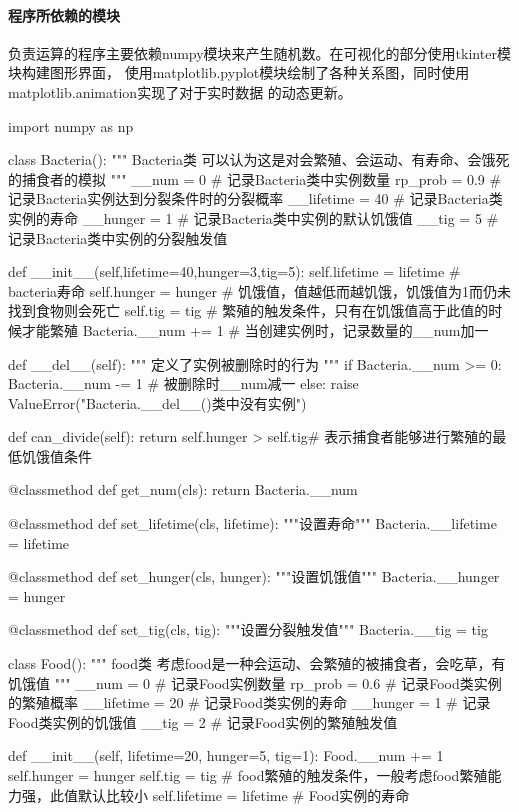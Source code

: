 \documentclass[a4paper]{ctexart}
\begin{document}
	\paragraph{程序所依赖的模块}
	负责运算的程序主要依赖numpy模块来产生随机数。在可视化的部分使用tkinter模块构建图形界面，
	使用matplotlib.pyplot模块绘制了各种关系图，同时使用matplotlib.animation实现了对于实时数据
	的动态更新。
	\\
	\begin{python}
	import numpy as np
	
	
	class Bacteria():
		"""
		Bacteria类
		可以认为这是对会繁殖、会运动、有寿命、会饿死的捕食者的模拟
		"""
		__num = 0  # 记录Bacteria类中实例数量
		rp_prob = 0.9  # 记录Bacteria实例达到分裂条件时的分裂概率
		__lifetime = 40  # 记录Bacteria类实例的寿命
		__hunger = 1  # 记录Bacteria类中实例的默认饥饿值
		__tig = 5  # 记录Bacteria类中实例的分裂触发值

		def __init__(self,lifetime=40,hunger=3,tig=5):
			self.lifetime = lifetime  # bacteria寿命
			self.hunger = hunger  # 饥饿值，值越低而越饥饿，饥饿值为1而仍未找到食物则会死亡
			self.tig = tig  # 繁殖的触发条件，只有在饥饿值高于此值的时候才能繁殖
			Bacteria.__num += 1  # 当创建实例时，记录数量的__num加一
	
		def __del__(self):
			"""
			定义了实例被删除时的行为
			"""
			if Bacteria.__num >= 0:
				Bacteria.__num -= 1  # 被删除时__num减一
			else:
				raise ValueError("Bacteria.__del__()类中没有实例")
	
		def can_divide(self):
			return self.hunger > self.tig# 表示捕食者能够进行繁殖的最低饥饿值条件
	
		@classmethod
		def get_num(cls):
			return Bacteria.__num
		
		@classmethod
		def set_lifetime(cls, lifetime):
			"""设置寿命"""
			Bacteria.__lifetime = lifetime
	
		@classmethod
		def set_hunger(cls, hunger):
			"""设置饥饿值"""
			Bacteria.__hunger = hunger
	
		@classmethod
		def set_tig(cls, tig):
			"""设置分裂触发值"""
			Bacteria.__tig = tig
	
	class Food():
		"""
		food类
		考虑food是一种会运动、会繁殖的被捕食者，会吃草，有饥饿值
		"""
		__num = 0  # 记录Food实例数量
		rp_prob = 0.6  # 记录Food类实例的繁殖概率
		__lifetime = 20  # 记录Food类实例的寿命
		__hunger = 1  # 记录Food类实例的饥饿值
		__tig = 2  # 记录Food实例的繁殖触发值
	
		def __init__(self, lifetime=20, hunger=5, tig=1):
			Food.__num += 1
			self.hunger = hunger
			self.tig = tig  # food繁殖的触发条件，一般考虑food繁殖能力强，此值默认比较小
			self.lifetime = lifetime  # Food实例的寿命
	

\end{python}
\end{document}
